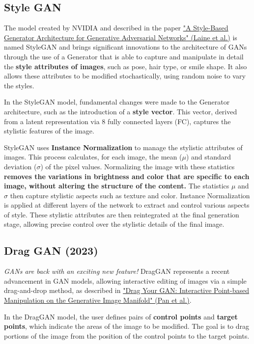 \subsection{Style GAN}

The model created by NVIDIA and described in the paper \href{https://arxiv.org/pdf/1812.04948}{"A Style-Based Generator Architecture for Generative Adversarial Networks" (Laine et al.)} is named StyleGAN and brings significant innovations to the architecture of GANs through the use of a Generator that is able to capture and manipulate in detail the \textbf{style attributes of images}, such as pose, hair type, or smile shape. It also allows these attributes to be modified stochastically, using random noise to vary the styles.

In the StyleGAN model, fundamental changes were made to the Generator architecture, such as the introduction of a \textbf{style vector}. This vector, derived from a latent representation via 8 fully connected layers (FC), captures the stylistic features of the image.

StyleGAN uses \textbf{Instance Normalization} to manage the stylistic attributes of images. This process calculates, for each image, the mean (\(\mu\)) and standard deviation (\(\sigma\)) of the pixel values. Normalizing the image with these statistics \textbf{removes the variations in brightness and color that are specific to each image, without altering the structure of the content.} The statistics \(\mu\) and \(\sigma\) then capture stylistic aspects such as texture and color. Instance Normalization is applied at different layers of the network to extract and control various aspects of style. These stylistic attributes are then reintegrated at the final generation stage, allowing precise control over the stylistic details of the final image.

\subsection{Drag GAN (2023)}

\textit{GANs are back with an exciting new feature!}  DragGAN represents a recent advancement in GAN models, allowing interactive editing of images via a simple drag-and-drop method, as described in \href{https://vcai.mpi-inf.mpg.de/projects/DragGAN/}{"Drag Your GAN: Interactive Point-based Manipulation on the Generative Image Manifold" (Pan et al.)}.

In the DragGAN model, the user defines pairs of \textbf{control points} and \textbf{target points}, which indicate the areas of the image to be modified. The goal is to drag portions of the image from the position of the control points to the target points.

